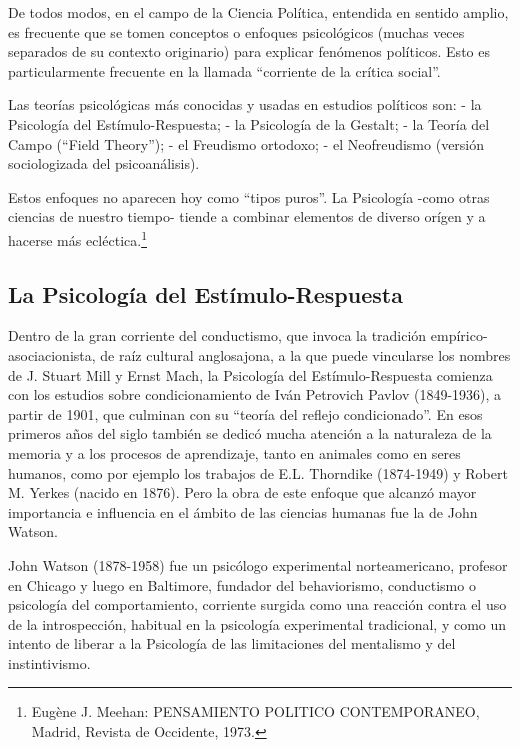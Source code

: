 \documentclass[
]{book}
\begin{document}
De todos modos, en el campo de la Ciencia Política, entendida en sentido amplio, es frecuente que se tomen conceptos o enfoques psicológicos (muchas veces separados de su contexto originario) para explicar fenómenos políticos. Esto es particularmente frecuente en la llamada ``corriente de la crítica social''.

Las teorías psicológicas más conocidas y usadas en estudios políticos son: - la Psicología del Estímulo-Respuesta; - la Psicología de la Gestalt; - la Teoría del Campo (``Field Theory''); - el Freudismo ortodoxo; - el Neofreudismo (versión sociologizada del psicoanálisis).

Estos enfoques no aparecen hoy como ``tipos puros''. La Psicología -como otras ciencias de nuestro tiempo- tiende a combinar elementos de diverso orígen y a hacerse más ecléctica.\footnote{Eugène J. Meehan: PENSAMIENTO POLITICO CONTEMPORANEO, Madrid, Revista de Occidente, 1973.}

\hypertarget{la-psicologuxeda-del-estuxedmulo-respuesta}{%
\subsection*{La Psicología del Estímulo-Respuesta}\label{la-psicologuxeda-del-estuxedmulo-respuesta}}

Dentro de la gran corriente del conductismo, que invoca la tradición empírico-asociacionista, de raíz cultural anglosajona, a la que puede vincularse los nombres de J. Stuart Mill y Ernst Mach, la Psicología del Estímulo-Respuesta comienza con los estudios sobre condicionamiento de Iván Petrovich Pavlov (1849-1936), a partir de 1901, que culminan con su ``teoría del reflejo condicionado''. En esos primeros años del siglo también se dedicó mucha atención a la naturaleza de la memoria y a los procesos de aprendizaje, tanto en animales como en seres humanos, como por ejemplo los trabajos de E.L. Thorndike (1874-1949) y Robert M. Yerkes (nacido en 1876). Pero la obra de este enfoque que alcanzó mayor importancia e influencia en el ámbito de las ciencias humanas fue la de John Watson.

John Watson (1878-1958) fue un psicólogo experimental norteamericano, profesor en Chicago y luego en Baltimore, fundador del behaviorismo, conductismo o psicología del comportamiento, corriente surgida como una reacción contra el uso de la introspección, habitual en la psicología experimental tradicional, y como un intento de liberar a la Psicología de las limitaciones del mentalismo y del instintivismo.
\end{document}
